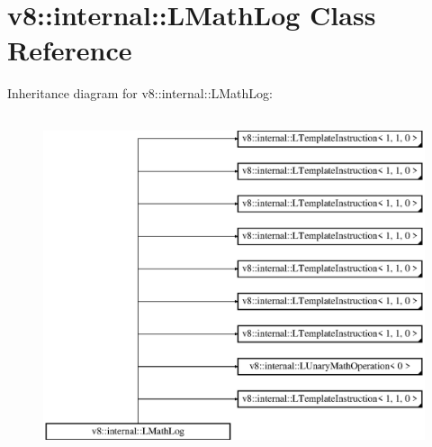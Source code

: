 \hypertarget{classv8_1_1internal_1_1_l_math_log}{}\section{v8\+:\+:internal\+:\+:L\+Math\+Log Class Reference}
\label{classv8_1_1internal_1_1_l_math_log}
Inheritance diagram for v8\+:\+:internal\+:\+:L\+Math\+Log\+:\begin{figure}[H]
\begin{center}
\leavevmode
\includegraphics[height=10.000000cm]{classv8_1_1internal_1_1_l_math_log}
\end{center}
\end{figure}
